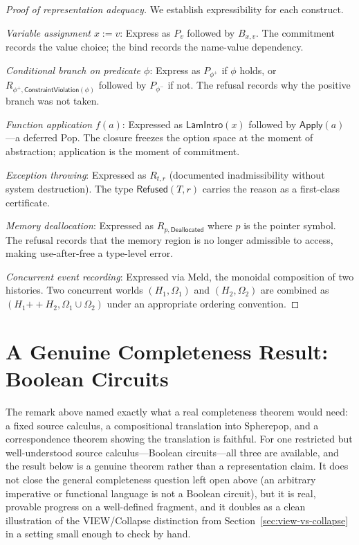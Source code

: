 \documentclass[12pt, a4paper, openany]{book}
\theoremstyle{plain}
\theoremstyle{definition}
\theoremstyle{remark}
\newcommand{\Rfsd}{\mathsf{Refused}}
\begin{document}
\begin{proof}[Proof of representation adequacy]
We establish expressibility for each construct.

\textit{Variable assignment $x := v$}: Express as $P_v$ followed by $B_{x,v}$.
The commitment records the value choice; the bind records the name-value
dependency.

\textit{Conditional branch on predicate $\phi$}: Express as $P_{\phi^+}$ if $\phi$
holds, or $R_{\phi^+,\mathsf{ConstraintViolation}(\phi)}$ followed by
$P_{\phi^-}$ if not. The refusal records why the positive branch was not taken.

\textit{Function application $f(a)$}: Expressed as $\mathsf{LamIntro}(x)$ followed
by $\mathsf{Apply}(a)$---a deferred Pop. The closure freezes the option space at
the moment of abstraction; application is the moment of commitment.

\textit{Exception throwing}: Expressed as $R_{t, r}$ (documented inadmissibility
without system destruction). The type $\Rfsd(T, r)$ carries the reason as a
first-class certificate.

\textit{Memory deallocation}: Expressed as $R_{p, \mathsf{Deallocated}}$ where
$p$ is the pointer symbol. The refusal records that the memory region is no longer
admissible to access, making use-after-free a type-level error.

\textit{Concurrent event recording}: Expressed via Meld, the monoidal composition
of two histories. Two concurrent worlds $(H_1, \Omega_1)$ and $(H_2, \Omega_2)$
are combined as $(H_1 \mathbin{++} H_2, \Omega_1 \cup \Omega_2)$ under an
appropriate ordering convention.
\end{proof}

\section{A Genuine Completeness Result: Boolean Circuits}
\label{sec:boolean-completeness}

The remark above named exactly what a real completeness theorem would need: a
fixed source calculus, a compositional translation into Spherepop, and a
correspondence theorem showing the translation is faithful. For one restricted
but well-understood source calculus---Boolean circuits---all three are
available, and the result below is a genuine theorem rather than a
representation claim. It does not close the general completeness question left
open above (an arbitrary imperative or functional language is not a Boolean
circuit), but it is real, provable progress on a well-defined fragment, and
it doubles as a clean illustration of the VIEW/Collapse distinction from
Section~\ref{sec:view-vs-collapse} in a setting small enough to check by hand.
\end{document}

